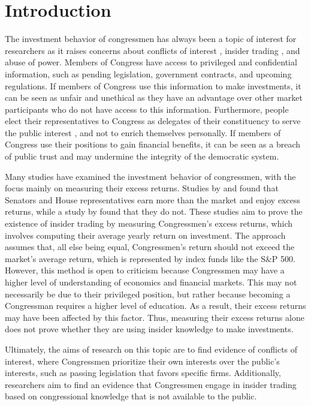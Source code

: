 \documentclass[15pt,letterpaper]{article}
\newcommand\spacingset[1]{\renewcommand{\baselinestretch}
{#1}\small\normalsize}
\begin{document}
\section{Introduction}
\spacingset{2} %
The investment behavior of congressmen has always been a topic of interest for researchers as it raises concerns about conflicts of interest \citep{TAHOUN201486}, insider trading \citep{Kim2012TheLT}, and abuse of power. Members of Congress have access to privileged and confidential information, such as pending legislation, government contracts, and upcoming regulations. 
If members of Congress use this information to make investments, it can be seen as unfair and unethical as they have an advantage over other market participants who do not have access to this information. 
Furthermore, people elect their representatives to Congress as delegates of their constituency to serve the public interest \citep{rep-del}, and not to enrich themselves personally. 
If members of Congress use their positions to gain financial benefits, it can be seen as a breach of public trust and may undermine the integrity of the democratic system.

Many studies have examined the investment behavior of congressmen, with the focus mainly on measuring their excess returns. Studies by \cite{zi11} and \cite{zi24} found that Senators and House representatives earn more than the market and enjoy excess returns, while a study by \cite{eg13} found that they do not. 
These studies aim to prove the existence of insider trading by measuring Congressmen's excess returns, which involves computing their average yearly return on investment. The approach assumes that, all else being equal, Congressmen's return should not exceed the market's average return, which is represented by index funds like the S\&P 500. 
However, this method is open to criticism because Congressmen may have a higher level of understanding of economics and financial markets. This may not necessarily be due to their privileged position, but rather because becoming a Congressman requires a higher level of education. As a result, their excess returns may have been affected by this factor.
Thus, measuring their excess returns alone does not prove whether they are using insider knowledge to make investments. 

Ultimately, the aims of research on this topic are to find evidence of conflicts of interest, where Congressmen prioritize their own interests over the public's interests, such as passing legislation that favors specific firms. Additionally, researchers aim to find an evidence that Congressmen engage in insider trading based on congressional knowledge that is not available to the public.
\end{document}
